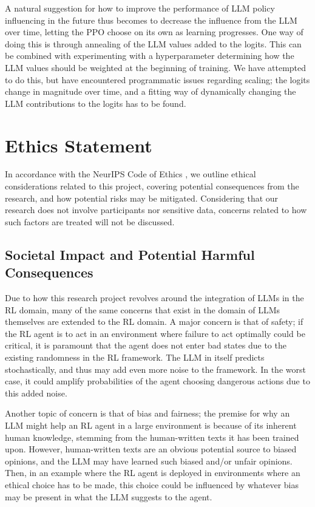 \documentclass[conference]{IEEEtran}
\begin{document}
A natural suggestion for how to improve the performance of LLM policy influencing in the future thus becomes to decrease the influence from the LLM over time, letting the PPO choose on its own as learning progresses. One way of doing this is through annealing of the LLM values added to the logits. This can be combined with experimenting with a hyperparameter determining how the LLM values should be weighted at the beginning of training. We have attempted to do this, but have encountered programmatic issues regarding scaling; the logits change in magnitude over time, and a fitting way of dynamically changing the LLM contributions to the logits has to be found.

\section*{Ethics Statement}

In accordance with the NeurIPS Code of Ethics \cite{ethics}, we outline ethical considerations related to this project, covering potential consequences from the research, and how potential risks may be mitigated. Considering that our research does not involve participants nor sensitive data, concerns related to how such factors are treated will not be discussed.

\subsection{Societal Impact and Potential Harmful Consequences}

Due to how this research project revolves around the integration of LLMs in the RL domain, many of the same concerns that exist in the domain of LLMs themselves are extended to the RL domain. A major concern is that of safety; if the RL agent is to act in an environment where failure to act optimally could be critical, it is paramount that the agent does not enter bad states due to the existing randomness in the RL framework. The LLM in itself predicts stochastically, and thus may add even more noise to the framework. In the worst case, it could amplify probabilities of the agent choosing dangerous actions due to this added noise.

Another topic of concern is that of bias and fairness; the premise for why an LLM might help an RL agent in a large environment is because of its inherent human knowledge, stemming from the human-written texts it has been trained upon. However, human-written texts are an obvious potential source to biased opinions, and the LLM may have learned such biased and/or unfair opinions. Then, in an example where the RL agent is deployed in environments where an ethical choice has to be made, this choice could be influenced by whatever bias may be present in what the LLM suggests to the agent.
\end{document}
